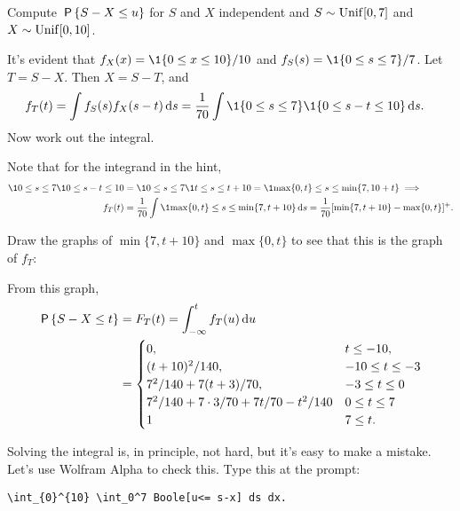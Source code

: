 \begin{exercise}\label{ex:l-148}
Compute $\P{S-X\leq u}$ for $S$ and $X$ independent and $S\sim \Unif{[0,7]}$ and $X\sim \Unif{[0,10]}$.
\begin{hint}
It's evident that $f_{X}(x) = \1{0\leq x \leq 10}/10$ and $f_{S}(s) = \1{0\leq s \leq 7}/7$. Let  $T=S-X$. Then $X=S-T$, and
\begin{align*}
f_{T}(t) &= \int f_{S}(s) f_{X}(s -t ) \d s = \frac{1}{70} \int \1{0\leq s \leq 7} \1{0\leq s-t \leq 10} \d s.
\end{align*}
Now work out the integral.
\end{hint}
\begin{solution}
Note that for the integrand in  the hint,
\begin{align*}
\1{0\leq s \leq 7} \1{0\leq s-t \leq 10} &= \1{0\leq s \leq 7} \1{t\leq s \leq t+10} =\1{\max\{0, t\} \leq s \leq \min\{7, 10+t\}} \implies \\
f_{T}(t)
&= \frac{1}{70}\int \1{\max\{0, t\} \leq s \leq \min\{7, t+10\}} \d s
= \frac{1}{70} [\min\{7, t+10\} - \max\{0, t\}]^{+}.
\end{align*}

Draw the graphs of $\min\{7, t+10\}$ and $\max\{0, t\}$ to see that this is the graph of $f_{T}$:
\begin{center}
\end{center}
From this graph,
\begin{align*}
\P{S-X \leq t} &= F_{T}(t) = \int_{-\infty}^{t} f_{T}(u) \d u \\
&=
  \begin{cases}
0, & t \leq -10, \\
    (t+10)^{2}/140, & -10 \leq t \leq -3 \\
7^{2}/140 + 7(t+3)/70, & -3 \leq t \leq 0 \\
7^{2}/140 + 7\cdot 3/70 + 7 t/70 - t^{2}/140 & 0 \leq t \leq 7 \\
1& 7 \leq t.
  \end{cases}
\end{align*}

Solving the integral is, in principle, not hard, but it's easy to make a mistake.
Let's use Wolfram Alpha to check this.
Type this at the prompt:
\begin{verbatim}
\int_{0}^{10} \int_0^7 Boole[u<= s-x] ds dx.
\end{verbatim}
\end{solution}
\end{exercise}


